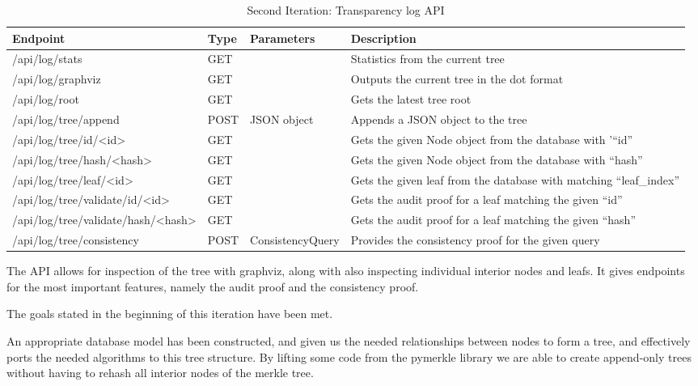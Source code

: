 \documentclass[../Main/thesis.tex]{subfiles}
\begin{document}
\begin{table}[H]
\footnotesize
\centering
\settowidth{}
\setlength\extrarowheight{2pt}
\begin{tabulary}{1.0\textwidth}{|l|L|l|L|}
\hline
    \textbf{Endpoint} & 
    \textbf{Type} & 
    \textbf{Parameters} & 
    \textbf{Description} \\
\hline
    /api/log/stats & GET & & Statistics from the current tree \\ \hline
    /api/log/graphviz & GET & & Outputs the current tree in the dot format \\ \hline
    /api/log/root & GET & & Gets the latest tree root \\ \hline
    /api/log/tree/append & POST & JSON object & Appends a JSON object to the tree \\ \hline
    /api/log/tree/id/<id> & GET & & Gets the given Node object from the database with '``id''\\ \hline
    /api/log/tree/hash/<hash> & GET & & Gets the given Node object from the database with ``hash''\\ \hline
    /api/log/tree/leaf/<id> & GET & & Gets the given leaf from the database with matching ``leaf\_index''\\ \hline
    /api/log/tree/validate/id/<id> & GET & & Gets the audit proof for a leaf matching the given ``id''\\ \hline
    /api/log/tree/validate/hash/<hash> & GET & & Gets the audit proof for a leaf matching the given ``hash''\\ \hline
    /api/log/tree/consistency & POST & ConsistencyQuery & Provides the consistency proof for the given query\\ \hline
\end{tabulary}
\caption{Second Iteration: Transparency log API}
\label{api:transparency_log}
\end{table}

The API allows for inspection of the tree with graphviz, along with also
inspecting individual interior nodes and leafs. It gives endpoints for the most
important features, namely the audit proof and the consistency proof.

The goals stated in the beginning of this iteration have been met. 

An appropriate database model has been constructed, and given us the needed
relationships between nodes to form a tree, and effectively ports the needed
algorithms to this tree structure. By lifting some code from the pymerkle
library we are able to create append-only trees without having to rehash all
interior nodes of the merkle tree.
\end{document}
